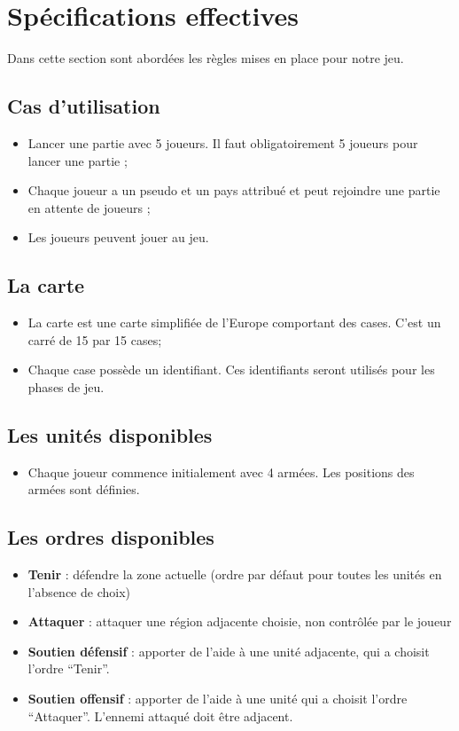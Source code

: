 \section{Spécifications effectives}
	Dans cette section sont abordées les règles mises en place pour notre jeu.

	\subsection{Cas d'utilisation}
		\begin{itemize}
			\item Lancer une partie avec 5 joueurs. Il faut obligatoirement 5 joueurs pour lancer une partie ;
			\item Chaque joueur a un pseudo et un pays attribué et peut rejoindre une partie en attente de joueurs ;
			\item Les joueurs peuvent jouer au jeu.
		\end{itemize}

	\subsection{La carte}
		\begin{itemize}
			\item La carte est une carte simplifiée de l'Europe comportant des cases. C'est un carré de 15 par 15 cases;
			\item Chaque case possède un identifiant. Ces identifiants seront utilisés pour les phases de jeu.
		\end{itemize}

	\subsection{Les unités disponibles}
		\begin{itemize}
			\item Chaque joueur commence initialement avec 4 armées. Les positions des armées sont définies.
		\end{itemize}

	\subsection{Les ordres disponibles}
		\begin{itemize}
			\item \textbf{Tenir} : défendre la zone actuelle (ordre par défaut pour toutes les unités en l'absence de choix)
			\item \textbf{Attaquer} : attaquer une région adjacente choisie, non contrôlée par le joueur
			\item \textbf{Soutien défensif} : apporter de l'aide à une unité adjacente, qui a choisit l'ordre \enquote{Tenir}.
			\item \textbf{Soutien offensif} : apporter de l'aide à une unité qui a choisit l'ordre \enquote{Attaquer}. L'ennemi attaqué doit être adjacent.
		\end{itemize}

